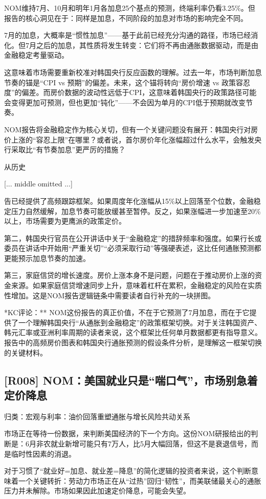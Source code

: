 \documentclass[11pt]{ctexart}
\begin{document}
NOM维持7月、10月和明年1月各加息25个基点的预测，终端利率仍看3.25\%。但报告的核心洞见在于：同样是加息，不同阶段的加息对市场的影响完全不同。

7月的加息，大概率是“惯性加息”——基于此前已经充分沟通的路径，市场已经消化。但7月之后的加息，其性质将发生转变：它们将不再由通胀数据驱动，而是由金融稳定考量驱动。

这意味着市场需要重新校准对韩国央行反应函数的理解。过去一年，市场判断加息节奏的锚是“CPI vs 预期”的偏差。未来，这个锚将转向“房价增速 vs 政策容忍度”的偏差。而房价数据的波动性远低于CPI，这意味着韩国央行的政策路径可能会变得更加可预测，但也更加“钝化”——不会因为单月的CPI低于预期就改变节奏。

NOM报告将金融稳定作为核心关切，但有一个关键问题没有展开：韩国央行对房价上涨的“容忍上限”在哪里？或者说，首尔房价年化涨幅超过什么水平，会触发央行采取比“有节奏加息”更严厉的措施？

从历史

[... middle omitted ...]

告已经提供了高频跟踪框架。如果周度年化涨幅从15\%以上回落至个位数，金融稳定压力自然缓解，加息节奏可能放缓甚至暂停。反之，如果涨幅进一步加速至20\%以上，市场需要为更鹰派的政策定价。

第二，韩国央行官员在公开讲话中关于“金融稳定”的措辞频率和强度。如果行长或委员在讲话中开始用“严重关切”“必须采取行动”等强硬表述，这比任何通胀预测都更能预示加息节奏的加速。

第三，家庭信贷的增长速度。房价上涨本身不是问题，问题在于推动房价上涨的资金来源。如果家庭信贷增速同步上升，意味着杠杆在累积，金融稳定的风险在实质性增加。这是NOM报告逻辑链条中需要读者自行补充的一块拼图。

*KC评论：** NOM这份报告的真正价值，不在于它预测了7月加息，而在于它提供了一个理解韩国央行“从通胀到金融稳定”的政策框架切换。对于关注韩国资产、韩元汇率或亚洲利率周期的读者来说，这个框架比任何单月数据都更有指导意义。报告中的高频房价图表和韩国央行通胀预测的假设条件分析，是理解这一框架切换的关键材料。

\subsection{[R008] NOM：美国就业只是“喘口气”，市场别急着定价降息}
{\small\color{refgray}归类：宏观与利率：油价回落重塑通胀与增长风险共动关系}

市场正在等待一份数据，来判断美国经济的下一个方向。这份NOM研报给出的判断是：6月非农就业新增可能只有7万人，比5月大幅回落，但这不是衰退信号，而是临时性因素的消退。

对于习惯了“就业好=加息、就业差=降息”的简化逻辑的投资者来说，这个判断意味着一个关键转折：劳动力市场正在从“过热”回归“韧性”，而美联储最关心的通胀压力并未解除。市场如果因此加速定价降息，可能会失望。
\end{document}
